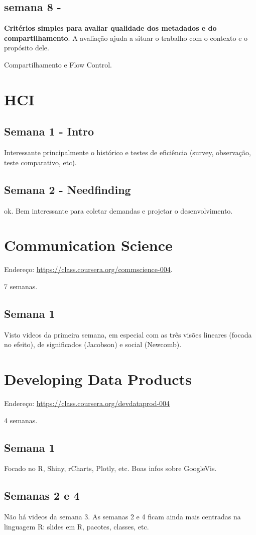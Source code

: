 \documentclass[12pt]{report}
\newcommand{\VV}[1]{{\bf \color{red} #1}}
\begin{document}
\subsection{ semana 8 - }

\VV{Critérios simples para avaliar qualidade dos metadados e do compartilhamento}. A avaliação ajuda a situar o trabalho com o contexto e o propósito dele.

Compartilhamento e Flow Control.

\section{HCI}
\subsection{Semana 1 - Intro}
Interessante principalmente o histórico e testes de eficiência (survey, observação, teste comparativo, etc).
\subsection{Semana 2 - Needfinding}
ok. Bem interessante para coletar demandas e projetar o desenvolvimento.
\section{Communication Science}
Endereço: \url{https://class.coursera.org/commscience-004}.

7 semanas.
\subsection{Semana 1}
Visto videos da primeira semana, em especial com as três visões lineares (focada no efeito), de significados (Jacobson) e social (Newcomb).
\section{Developing Data Products}
Endereço: \url{https://class.coursera.org/devdataprod-004}

4 semanas.
\subsection{Semana 1}
Focado no R, Shiny, rCharts, Plotly, etc. Boas infos sobre GoogleVis.
\subsection{Semanas 2 e 4}
Não há videos da semana 3. As semanas 2 e 4 ficam ainda mais centradas na linguagem R: slides em R, pacotes, classes, etc.
\end{document}
